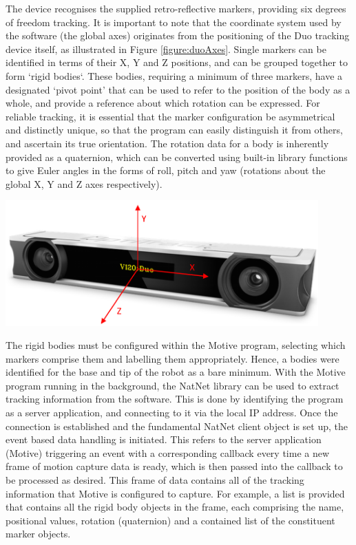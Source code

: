\documentclass[11pt]{article}
\begin{document}
The device recognises the supplied retro-reflective markers, providing six degrees of freedom tracking. It is important to note that the coordinate system used by the software (the global axes) originates from the positioning of the Duo tracking device itself, as illustrated in Figure \ref{figure:duoAxes}. Single markers can be identified in terms of their X, Y and Z positions, and can be grouped together to form `rigid bodies`. These bodies, requiring a minimum of three markers, have a designated `pivot point' that can be used to refer to the position of the body as a whole, and provide a reference about which rotation can be expressed. For reliable tracking, it is essential that the marker configuration be asymmetrical and distinctly unique, so that the program can easily distinguish it from others, and ascertain its true orientation. The rotation data for a body is inherently provided as a quaternion, which can be converted using built-in library functions to give Euler angles in the forms of roll, pitch and yaw (rotations about the global X, Y and Z axes respectively).


\begin{center}
\includegraphics[width=0.9\textwidth]{images/duoAxes.png}
\label{figure:duoAxes}
\end{center}

The rigid bodies must be configured within the Motive program, selecting which markers comprise them and labelling them appropriately. Hence, a bodies were identified for the base and tip of the robot as a bare minimum. With the Motive program running in the background, the NatNet library can be used to extract tracking information from the software. This is done by identifying the program as a server application, and connecting to it via the local IP address. Once the connection is established and the fundamental NatNet client object is set up, the event based data handling is initiated. This refers to the server application (Motive) triggering an event with a corresponding callback every time a new frame of motion capture data is ready, which is then passed into the callback to be processed as desired. This frame of data contains all of the tracking information that Motive is configured to capture. For example, a list is provided that contains all the rigid body objects in the frame, each comprising the name, positional values, rotation (quaternion) and a contained list of the constituent marker objects.
\end{document}
